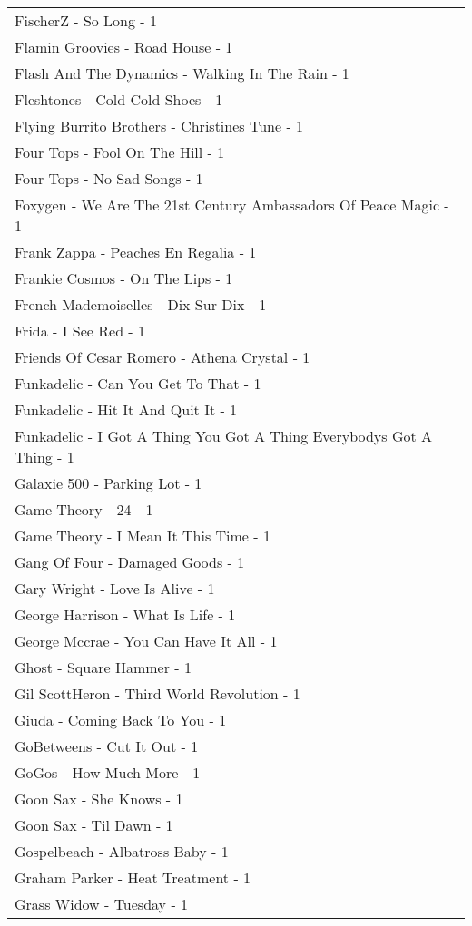 \documentclass[
]{article}
\begin{document}
\begin{longtable}{l}
FischerZ - So Long - 1 \\ 
Flamin Groovies - Road House - 1 \\ 
Flash And The Dynamics - Walking In The Rain - 1 \\ 
Fleshtones - Cold Cold Shoes - 1 \\ 
Flying Burrito Brothers - Christines Tune - 1 \\ 
Four Tops - Fool On The Hill - 1 \\ 
Four Tops - No Sad Songs - 1 \\ 
Foxygen - We Are The 21st Century Ambassadors Of Peace Magic - 1 \\ 
Frank Zappa - Peaches En Regalia - 1 \\ 
Frankie Cosmos - On The Lips - 1 \\ 
French Mademoiselles - Dix Sur Dix - 1 \\ 
Frida - I See Red - 1 \\ 
Friends Of Cesar Romero - Athena Crystal - 1 \\ 
Funkadelic - Can You Get To That - 1 \\ 
Funkadelic - Hit It And Quit It - 1 \\ 
Funkadelic - I Got A Thing You Got A Thing Everybodys Got A Thing - 1 \\ 
Galaxie 500 - Parking Lot - 1 \\ 
Game Theory - 24 - 1 \\ 
Game Theory - I Mean It This Time - 1 \\ 
Gang Of Four - Damaged Goods - 1 \\ 
Gary Wright - Love Is Alive - 1 \\ 
George Harrison - What Is Life - 1 \\ 
George Mccrae - You Can Have It All - 1 \\ 
Ghost - Square Hammer - 1 \\ 
Gil ScottHeron - Third World Revolution - 1 \\ 
Giuda - Coming Back To You - 1 \\ 
GoBetweens - Cut It Out - 1 \\ 
GoGos - How Much More - 1 \\ 
Goon Sax - She Knows - 1 \\ 
Goon Sax - Til Dawn - 1 \\ 
Gospelbeach - Albatross Baby - 1 \\ 
Graham Parker - Heat Treatment - 1 \\ 
Grass Widow - Tuesday - 1 \\ 

\end{longtable}
\end{document}
